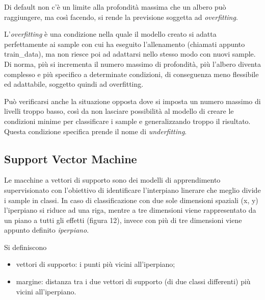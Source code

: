 \documentclass[12pt,a4paper]{article}
\begin{document}
Di default non c'è un limite alla profondità massima che un albero può raggiungere, ma così facendo, si rende la previsione soggetta ad \textit{overfitting}.

L'\textit{overfitting} è una condizione nella quale il modello creato si adatta perfettamente ai sample con cui ha eseguito l'allenamento (chiamati appunto train\_data), ma non riesce poi ad adattarsi nello stesso modo con nuovi sample.
Di norma, più si incrementa il numero massimo di profondità, più l'albero diventa complesso e più specifico a determinate condizioni, di conseguenza meno flessibile ed adattabile, soggetto quindi ad overfitting.

Può verificarsi anche la situazione opposta dove si imposta un numero massimo di livelli troppo basso, così da non lasciare possibilità al modello di creare le condizioni minime per classificare i sample e generalizzando troppo il risultato. Questa condizione specifica prende il nome di \textit{underfitting}. 

\subsection{Support Vector Machine}
Le macchine a vettori di supporto sono dei modelli di apprendimento supervisionato con l'obiettivo di identificare l'interpiano linerare che meglio divide i sample in classi. In caso di classificazione con due sole dimensioni spaziali (x, y) l'iperpiano si riduce ad una riga, mentre a tre dimensioni viene rappresentato da un piano a tutti gli effetti (figura 12), invece con più di tre dimensioni viene appunto definito \textit{iperpiano}.

Si definiscono
\begin{itemize}
    \item vettori di supporto: i punti più vicini all'iperpiano;
    \item margine: distanza tra i due vettori di supporto (di due classi differenti) più vicini all'iperpiano.
\end{itemize}
\end{document}
